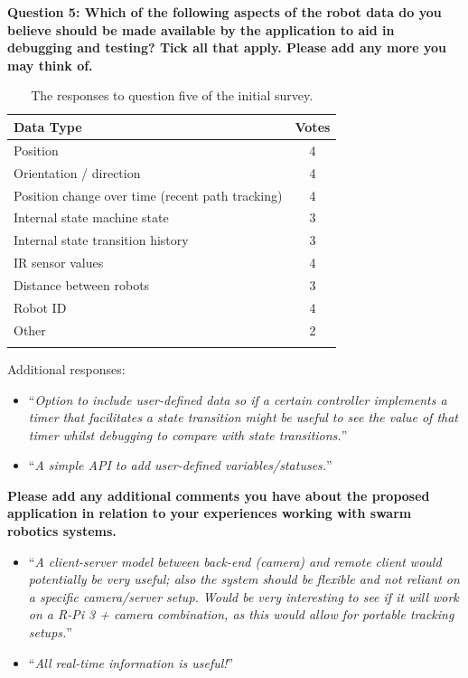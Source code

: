 \noindent\textbf{Question 5: Which of the following aspects of the robot data do you believe should be made available by the application to aid in debugging and testing? Tick all that apply. Please add any more you may think of.}

\begin{longtable}{ p{10cm} c }
 \textbf{Data Type} & \textbf{Votes}\\ 
 \hline
 Position & 4\\
 Orientation / direction & 4\\
 Position change over time (recent path tracking) & 4\\
 Internal state machine state & 3\\
 Internal state transition history & 3\\
 IR sensor values & 4\\
 Distance between robots & 3\\
 Robot ID & 4\\
 Other & 2\\
 \bottomrule
 \caption[Initial Survey Question 5 Responses]{The responses to question five of the initial survey.}
 \label{tab:QuestionFiveData}
\end{longtable}

Additional responses:

\begin{itemize}
\item ``\textit{Option to include user-defined data so if a certain controller implements a timer that facilitates a state transition might be useful to see the value of that timer whilst debugging to compare with state transitions.}''
\item ``\textit{A simple API to add user-defined variables/statuses.}''
\end{itemize}

\noindent\textbf{Please add any additional comments you have about the proposed application in relation to your experiences working with swarm robotics systems.}

\begin{itemize}
\item ``\textit{A client-server model between back-end (camera) and remote client would potentially be very useful; also the system should be flexible and not reliant on a specific camera/server setup. Would be very interesting to see if it will work on a R-Pi 3 + camera combination, as this would allow for portable tracking setups.}''
\item ``\textit{All real-time information is useful!}''
\end{itemize}


